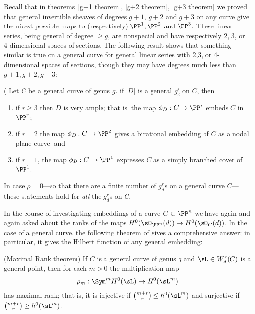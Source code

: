 Recall that  in theorems~\ref{g+1 theorem}, \ref{g+2 theorem}, \ref{g+3 theorem} we proved that
general invertible sheaves of degrees $g+1$, $g+2$ and $g+3$ on any curve
give the nicest possible maps to (respectively) $\PP^1, \PP^2$ and $\PP^3.$ These
linear series, being general of degree $\geq g$, are  nonspecial and have respectively
2, 3, or 4-dimensional spaces of sections. The following result shows that something
similar is true on a general curve for general linear series with 2,3, or 4-dimensional
spaces of sections, though they may have degrees much less than $g+1, g+2, g+3$:

\begin{theorem}\label{grd omnibus}(\cite[Proposition 5.4]{Eisenbud-Harris83}
Let $C$ be a general curve of genus $g$.
 if $|D|$ is a general $g^r_d$ on $C$, then

 \begin{enumerate}
\item if $r \geq 3$ then $D$ is very ample; that is, the map $\phi_D : C \to \PP^r$   embeds $C$ in $\PP^r$;
\item if $r=2$ the map $\phi_D : C \to \PP^2$ gives a birational embedding of $C$ as a nodal plane curve; and 
\item if $r=1$, the map $\phi_D : C \to \PP^1$ expresses $C$ as a simply branched cover of $\PP^1$.
\end{enumerate}
\end{theorem}

In case $\rho = 0$---so that there are a finite number of $g^r_d$s on a general curve $C$---these statements hold for \emph{all} the $g^r_d$s on $C$.

In the course of investigating embeddings of a curve $C\subset \PP^n$ we have again and again
asked about the ranks of the maps $H^0(\sO_{\PP^n}(d)) \to H^0(\sO_C(d))$. In the case of
a general curve, the following theorem of \cite{Larson} gives a comprehensive answer; in particular, it gives
 the Hilbert function of any general embedding:
 
\begin{theorem}[Larson](Maximal Rank theorem)\label{maximal rank}
If $C$ is a general curve of genus $g$ and $\sL  \in W^r_d(C)$ is a general point, then for each $m > 0$ the multiplication map
$$
\rho_m : \Sym^m H^0(\sL ) \to H^0(\sL ^m)
$$
has maximal rank; that is, it is injective if $\binom{m+r}{r} \leq h^0(\sL ^m)$ and surjective if $\binom{m+r}{r} \geq h^0(\sL ^m)$.
\end{theorem}


